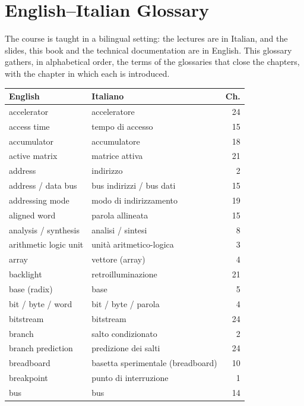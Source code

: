 \chapter{English--Italian Glossary}
\label{app:glossary}

The course is taught in a bilingual setting: the lectures are in Italian, and
the slides, this book and the technical documentation are in English. This
glossary gathers, in alphabetical order, the terms of the glossaries that close
the chapters, with the chapter in which each is introduced.

{\small
\begin{longtable}{@{}p{}p{}r@{}}
\toprule
\textbf{English} & \textbf{Italiano} & \textbf{Ch.}\\
\midrule
\endhead
\bottomrule
\endfoot
accelerator & acceleratore & 24\\
access time & tempo di accesso & 15\\
accumulator & accumulatore & 18\\
active matrix & matrice attiva & 21\\
address & indirizzo & 2\\
address / data bus & bus indirizzi / bus dati & 15\\
addressing mode & modo di indirizzamento & 19\\
aligned word & parola allineata & 15\\
analysis / synthesis & analisi / sintesi & 8\\
arithmetic logic unit & unità aritmetico-logica & 3\\
array & vettore (array) & 4\\
backlight & retroilluminazione & 21\\
base (radix) & base & 5\\
bit / byte / word & bit / byte / parola & 4\\
bitstream & bitstream & 24\\
branch & salto condizionato & 2\\
branch prediction & predizione dei salti & 24\\
breadboard & basetta sperimentale (breadboard) & 10\\
breakpoint & punto di interruzione & 1\\
bus & bus & 14\\

\end{longtable}}
